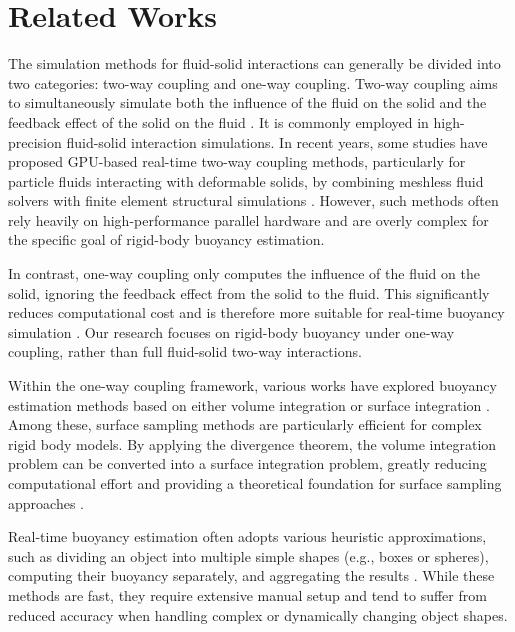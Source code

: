 \section{Related Works}

The simulation methods for fluid-solid interactions can generally be divided into two categories: two-way coupling and one-way coupling. Two-way coupling aims to simultaneously simulate both the influence of the fluid on the solid and the feedback effect of the solid on the fluid \cite{benra2011comparison}. It is commonly employed in high-precision fluid-solid interaction simulations. In recent years, some studies have proposed GPU-based real-time two-way coupling methods, particularly for particle fluids interacting with deformable solids, by combining meshless fluid solvers with finite element structural simulations \cite{yang2012realtime}. However, such methods often rely heavily on high-performance parallel hardware and are overly complex for the specific goal of rigid-body buoyancy estimation.

In contrast, one-way coupling only computes the influence of the fluid on the solid, ignoring the feedback effect from the solid to the fluid. This significantly reduces computational cost and is therefore more suitable for real-time buoyancy simulation \cite{benra2011comparison}. Our research focuses on rigid-body buoyancy under one-way coupling, rather than full fluid-solid two-way interactions.

Within the one-way coupling framework, various works have explored buoyancy estimation methods based on either volume integration or surface integration \cite{BAJ20}\cite{kellomaki2014rigid}. Among these, surface sampling methods are particularly efficient for complex rigid body models. By applying the divergence theorem, the volume integration problem can be converted into a surface integration problem, greatly reducing computational effort and providing a theoretical foundation for surface sampling approaches \cite{UTSAWikiDivergenceTheorem}.

Real-time buoyancy estimation often adopts various heuristic approximations, such as dividing an object into multiple simple shapes (e.g., boxes or spheres), computing their buoyancy separately, and aggregating the results \cite{GER13}\cite{BAJ20}. While these methods are fast, they require extensive manual setup and tend to suffer from reduced accuracy when handling complex or dynamically changing object shapes.

